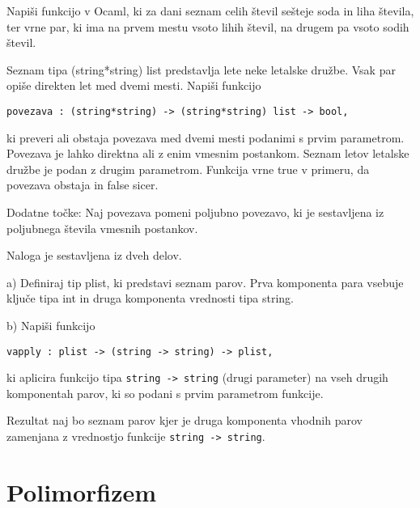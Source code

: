 \begin{ex}
Napi\v si funkcijo v Ocaml, ki za dani seznam celih \v stevil se\v steje soda in liha \v stevila, ter vrne par, ki ima na prvem mestu vsoto lihih \v stevil, na drugem pa vsoto sodih \v stevil.

\end{ex} 
\begin{ex}
  Seznam tipa (string*string) list predstavlja lete neke letalske
  dru\v zbe. Vsak par opi\v se direkten let med dvemi mesti. Napi\v si
  funkcijo

\begin{lstlisting}
povezava : (string*string) -> (string*string) list -> bool,
\end{lstlisting}

  ki preveri ali obstaja povezava med dvemi mesti podanimi s prvim
  parametrom. Povezava je lahko direktna ali z enim vmesnim
  postankom. Seznam letov letalske dru\v zbe je podan z drugim
  parametrom. Funkcija vrne true v primeru, da povezava obstaja in
  false sicer.

  Dodatne to\v cke: Naj povezava pomeni poljubno povezavo, ki je
  sestavljena iz poljubnega \v stevila vmesnih postankov.


\end{ex} 
\begin{ex}Naloga je sestavljena iz dveh delov.

  a) Definiraj tip plist, ki predstavi seznam parov. Prva komponenta
  para vsebuje klju\v ce tipa int in druga komponenta vrednosti tipa
  string.

  b) Napi\v si funkcijo  
\begin{lstlisting}
vapply : plist -> (string -> string) -> plist,
\end{lstlisting}
  ki aplicira funkcijo tipa \lstinline{string -> string} (drugi parameter) na vseh
  drugih komponentah parov, ki so podani s prvim parametrom
  funkcije. 

  Rezultat naj bo seznam parov kjer je druga komponenta vhodnih parov
  zamenjana z vrednostjo funkcije 
  \lstinline{string -> string}.


\end{ex} 

\section{Polimorfizem}

